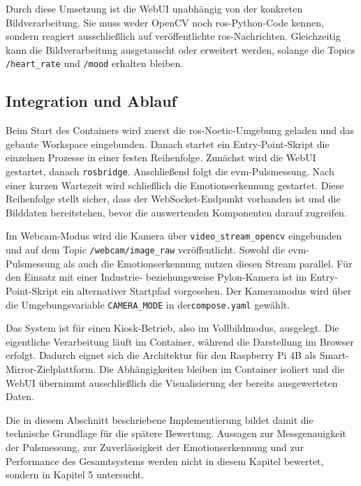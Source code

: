 Durch diese Umsetzung ist die WebUI unabhängig von der konkreten Bildverarbeitung. Sie muss weder OpenCV noch \ac{ros}-Python-Code kennen, sondern reagiert ausschließlich auf veröffentlichte \ac{ros}-Nachrichten. Gleichzeitig kann die Bildverarbeitung ausgetauscht oder erweitert werden, solange die Topics \texttt{/heart\_rate} und \texttt{/mood} erhalten bleiben.

\subsection{Integration und Ablauf}

Beim Start des Containers wird zuerst die \ac{ros}-Noetic-Umgebung geladen und das gebaute Workspace eingebunden. Danach startet ein Entry-Point-Skript die einzelnen Prozesse in einer festen Reihenfolge. Zunächst wird die WebUI gestartet, danach \texttt{rosbridge}. Anschließend folgt die \ac{evm}-Pulsmessung. Nach einer kurzen Wartezeit wird schließlich die Emotionserkennung gestartet. Diese Reihenfolge stellt sicher, dass der WebSocket-Endpunkt vorhanden ist und die Bilddaten bereitstehen, bevor die auswertenden Komponenten darauf zugreifen.

Im Webcam-Modus wird die Kamera über \texttt{video\_stream\_opencv} eingebunden und auf dem Topic \texttt{/webcam/image\_raw} veröffentlicht. Sowohl die \ac{evm}-Pulsmessung als auch die Emotionserkennung nutzen diesen Stream parallel. Für den Einsatz mit einer Industrie- beziehungsweise Pylon-Kamera ist im Entry-Point-Skript ein alternativer Startpfad vorgesehen. Der Kameramodus wird über die Umgebungsvariable \texttt{CAMERA\_MODE} in der\break \texttt{compose.yaml} gewählt.

Das System ist für einen Kiosk-Betrieb, also im Vollbildmodus, ausgelegt. Die eigentliche Verarbeitung läuft im Container, während die Darstellung im Browser erfolgt. Dadurch eignet sich die Architektur für den Raspberry Pi 4B als Smart-Mirror-Zielplattform. Die Abhängigkeiten bleiben im Container isoliert und die WebUI übernimmt ausschließlich die Visualisierung der bereits ausgewerteten Daten.

Die in diesem Abschnitt beschriebene Implementierung bildet damit die technische Grundlage für die spätere Bewertung. Aussagen zur Messgenauigkeit der Pulsmessung, zur Zuverlässigkeit der Emotionserkennung und zur Performance des Gesamtsystems werden nicht in diesem Kapitel bewertet, sondern in Kapitel 5 untersucht.